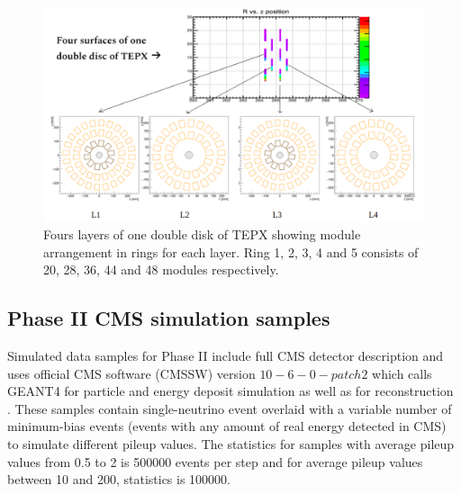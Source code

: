 \begin{figure}[H]
  \centering
  \includegraphics[width=1 \columnwidth]{ashish_thesis/fourlayers.png}
  \caption{ \onehalfspacing Fours layers of one double disk of TEPX showing module arrangement in rings for each layer. Ring 1, 2, 3, 4 and 5 consists of 20, 28, 36, 44 and 48 modules respectively. }
  \label{fig:CMS}
\end{figure}

\subsection{Phase II CMS simulation samples}

 Simulated data samples for Phase II include full CMS detector description and uses official CMS software (CMSSW) version $10-6-0-patch2$ which calls GEANT4 for particle and energy deposit simulation as well as for reconstruction \cite{Agostinelli:2002hh}. These samples contain single-neutrino event overlaid with a variable number of minimum-bias events (events with any amount of real energy detected in CMS) to simulate different pileup values. The statistics for samples with average pileup values from 0.5 to 2 is 500000 events per step and for average pileup values between 10 and 200, statistics is 100000. 


